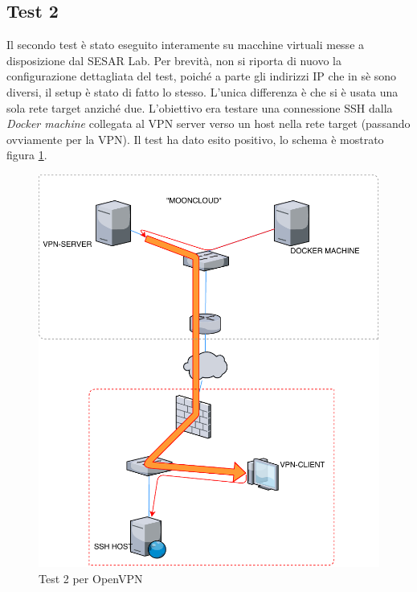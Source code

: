 \subsection{Test 2}
Il secondo test è stato eseguito interamente su macchine virtuali messe
a disposizione dal SESAR Lab. Per brevità, non si riporta di nuovo la
configurazione dettagliata del test, poiché a parte gli indirizzi IP
che in sè sono diversi, il setup è stato di fatto lo stesso. L'unica
differenza è che si è usata una sola rete target anziché due.
L'obiettivo era testare una connessione SSH dalla \textit{Docker machine}
collegata al VPN server verso un host nella rete target (passando
ovviamente per la VPN).
Il test ha dato esito positivo, lo schema è mostrato figura \ref{fig:openvpn-test2}.
\begin{figure}
  \includegraphics[scale=0.55]{img/openvpn_test2}
  \caption{Test 2 per OpenVPN}
  \label{fig:openvpn-test2}
\end{figure}